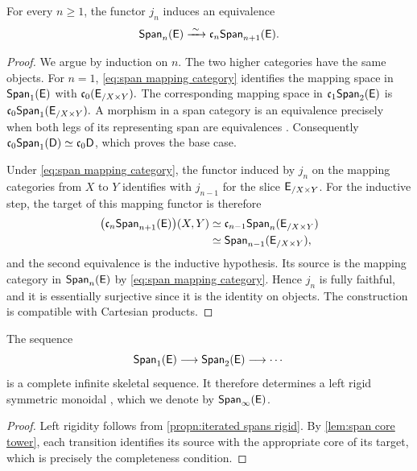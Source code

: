 \documentclass[a4paper,11pt]{article}
\begin{document}
\begin{lemma}\label{lem:span core tower}
  For every $n\geq1$, the functor $j_n$ induces an equivalence
  \[
    \Span_n(\oE)\xrightarrow{\;\sim\;}
      \core[n]\Span_{n+1}(\oE).
  \]
\end{lemma}

\begin{proof}
  We argue by induction on $n$.  The two higher categories have the
  same objects.  For $n=1$, \cref{eq:span mapping category} identifies
  the mapping space in $\Span_1(\oE)$ with
  $
    \core[0](\oE_{/X\times Y}).
  $
  The corresponding mapping space in
  $\core[1]\Span_2(\oE)$ is
  $
    \core[0]\Span_1(\oE_{/X\times Y}).
  $
  A morphism in a span category is an equivalence precisely when both
  legs of its representing span are equivalences
  \cite[Lemma~8.2]{HaugsengSpans}.  Consequently
  $\core[0]\Span_1(\oD)\simeq\core[0]\oD$, which proves the base
  case.

  Under \cref{eq:span mapping category}, the functor induced by $j_n$
  on the mapping categories from $X$ to $Y$ identifies with
  $j_{n-1}$ for the slice $\oE_{/X\times Y}$.  For the inductive step,
  the target of this mapping functor is therefore
  \[
    \begin{split}
      \bigl(\core[n]\Span_{n+1}(\oE)\bigr)(X,Y)
        &\simeq \core[n-1]\Span_n(\oE_{/X\times Y}) \\
        &\simeq \Span_{n-1}(\oE_{/X\times Y}),
    \end{split}
  \]
  and the second equivalence is the inductive hypothesis.  Its source
  is the mapping category in $\Span_n(\oE)$ by
  \cref{eq:span mapping category}.  Hence $j_n$ is fully faithful,
  and it is essentially surjective since it is the identity on
  objects.  The construction is compatible with Cartesian products.
\end{proof}

\begin{cor}\label{cor:span skeletal sequence}
  The sequence
  \[
    \Span_1(\oE)\longrightarrow\Span_2(\oE)
      \longrightarrow\cdots
  \]
  is a complete infinite skeletal sequence.  It therefore determines
  a left rigid symmetric monoidal \iicat{}, which we denote by
  $\Span_{\infty}(\oE)$.
\end{cor}

\begin{proof}
  Left rigidity follows from
  \cref{propn:iterated spans rigid}.  By
  \cref{lem:span core tower}, each transition identifies its source
  with the appropriate core of its target, which is precisely the
  completeness condition.
\end{proof}
\end{document}
